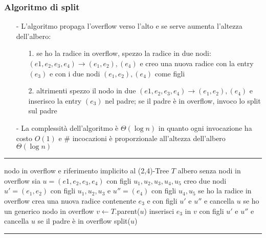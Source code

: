 \documentclass[a4paper]{article}
\makeatletter
\newenvironment{algo}[4]{
	\noindent\rule{\textwidth}{0.4pt}
	\begin{algorithmic}[1]
		\addtocounter{ALG@line}{-1}
		\Procedure{#1}{#2}
		\Require #3
		\Ensure #4
		\Statex }{
		\EndProcedure
	\end{algorithmic}
	\rule{\textwidth}{0.4pt}}
\makeatother
\begin{document}
\subsubsection*{Algoritmo di split}
\begin{itemize}[topsep=3pt, itemsep=0pt]
	\item[-] L'algoritmo propaga l'overflow verso l'alto e se serve aumenta l'altezza dell'albero:
	\begin{itemize}[topsep=0pt, itemsep=0pt]
		\item[1.] se ho la radice in overflow, spezzo la radice in due nodi: \((e1, e_2, e_3, e_4) \rightarrow (e_1,e_2), (e_4)\)
		e creo una nuova radice con la entry  \((e_3)\) e con i due nodi \((e_1,e_2), (e_4)\) come figli
		\item[2.] altrimenti spezzo il nodo in due \((e1, e_2, e_3, e_4) \rightarrow (e_1,e_2), (e_4)\) e inserisco la entry
		 \((e_3)\) nel padre; se il padre è in overflow, invoco lo split sul padre
	\end{itemize}
	\item[-] La complessità dell'algoritmo è \(\Theta(\log n)\) in quanto ogni invocazione ha costo \(O(1)\) e \# incocazioni
	è proporzionale all'altezza dell'albero \(\Theta(\log n)\)
\end{itemize}
\begin{algo}{split}{$u$}{nodo in overflow e riferimento implicito al (2,4)-Tree $T$}{albero senza nodi in overflow}
	\State sia $u = (e1, e_2, e_3, e_4)$ con figli $u_1, u_2, u_3, u_4, u_5$
	\State creo due nodi $u' = (e_1, e_2)$ con figli $u_1, u_2, u_3$ e $u'' = (e_4)$ con figli $u_4, u_5$
	 \Comment se ho la radice in overflow
		\State crea una nuova radice contenente $e_3$ e con figli $u'$ e $u''$ e cancella $u$
	\Else \Comment se ho un generico nodo in overflow
		\State $v \gets T$.parent($u$)
		\State inserisci $e_3$ in $v$ con figli $u'$ e $u''$ e cancella $u$
		 \Comment se il padre è in overflow
			\State split($u$)
		\EndIf
	\EndIf
\end{algo}
\end{document}
